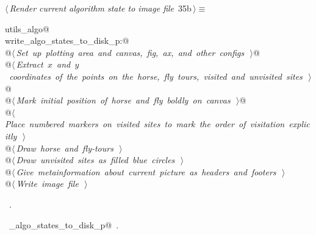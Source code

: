 \documentclass[11.5pt]{report}
\begin{document}
\begin{flushleft} \small\label{scrap30}\raggedright\small
{} $\langle\,${\itshape Render current algorithm state to image file}\nobreak\ {\footnotesize {35b}}$\,\rangle\equiv$
\vspace{-1ex}
\begin{list}{}{} \item
\mbox{}\verb@import utils_algo@\\
\mbox{}\verb@if write_algo_states_to_disk_p:@\\
\mbox{}\verb@     @\hbox{$\langle\,${\itshape Set up plotting area and canvas, fig, ax, and other configs}\nobreak\ {\footnotesize {}}$\,\rangle$}\verb@  @\\
\mbox{}\verb@     @\hbox{$\langle\,${\itshape Extract $x$ and $y$ coordinates of the points on the horse, fly tours, visited and unvisited sites}\nobreak\ {\footnotesize {}}$\,\rangle$}\verb@  @\\
\mbox{}\verb@     @\hbox{$\langle\,${\itshape Mark initial position of horse and fly boldly on canvas}\nobreak\ {\footnotesize {}}$\,\rangle$}\verb@  @\\
\mbox{}\verb@     @\hbox{$\langle\,${\itshape Place numbered markers on visited sites to mark the order of visitation explicitly}\nobreak\ {\footnotesize {}}$\,\rangle$}\verb@@\\
\mbox{}\verb@     @\hbox{$\langle\,${\itshape Draw horse and fly-tours}\nobreak\ {\footnotesize {}}$\,\rangle$}\verb@@\\
\mbox{}\verb@     @\hbox{$\langle\,${\itshape Draw unvisited sites as filled blue circles}\nobreak\ {\footnotesize {}}$\,\rangle$}\verb@@\\
\mbox{}\verb@     @\hbox{$\langle\,${\itshape Give metainformation about current picture as headers and footers}\nobreak\ {\footnotesize {}}$\,\rangle$}\verb@@\\
\mbox{}\verb@     @\hbox{$\langle\,${\itshape Write image file}\nobreak\ {\footnotesize {}}$\,\rangle$}\verb@@\\
\mbox{}\verb@@{\NWsep}
\end{list}
\vspace{-1.5ex}
\footnotesize
\begin{list}{}{\setlength{\itemsep}{-\parsep}\setlength{\itemindent}{-\leftmargin}}
\item \NWtxtMacroRefIn\ .
\item \NWtxtIdentsUsed\nobreak\  \verb@write_algo_states_to_disk_p@\nobreak\ .
\item{}
\end{list}
\vspace{4ex}
\end{flushleft}
\end{document}
